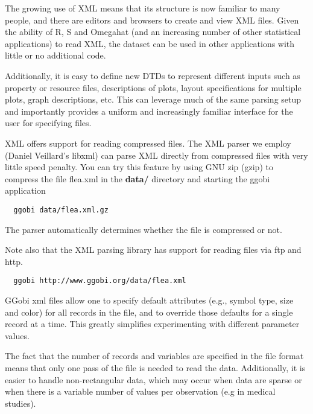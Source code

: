 \documentclass{article}
\def\strip#1>{}
\def\Escape#1{\def\next{#1}%
{\frenchspacing\expandafter\strip\meaning\next}}
\def\dir#1{\textbf{\Escape{#1/}}}
\def\directory#1{\dir{#1}}
\begin{document}
The growing use of XML means that its structure is now familiar to
many people, and there are editors and browsers to create and view XML
files.  Given the ability of R, S and Omegahat (and an increasing
number of other statistical applications) to read XML, the dataset can
be used in other applications with little or no additional code.


Additionally, it is easy to define new DTDs to represent different
inputs such as property or resource files, descriptions of plots,
layout specifications for multiple plots, graph descriptions, etc.
This can leverage much of the same parsing setup and importantly
provides a uniform and increasingly familiar interface for the user
for specifying files.


XML offers support for reading compressed files.  The XML parser we
employ (Daniel Veillard's libxml) can parse XML directly from
compressed files with very little speed penalty.  You can try this
feature by using GNU zip (gzip) to compress the file flea.xml in the
\directory{data} directory and starting the ggobi application
\begin{verbatim}
  ggobi data/flea.xml.gz
\end{verbatim}
The parser automatically determines whether the file is compressed or
not.


Note also that the XML parsing library has support for reading files
via ftp and http.
\begin{verbatim}
  ggobi http://www.ggobi.org/data/flea.xml
\end{verbatim}


GGobi xml files allow one to specify default attributes (e.g., symbol
type, size and color) for all records in the file, and to override
those defaults for a single record at a time.  This greatly simplifies
experimenting with different parameter values.


The fact that the number of records and variables are specified in the
file format means that only one pass of the file is needed to read the
data.  Additionally, it is easier to handle non-rectangular data,
which may occur when data are sparse or when there is a variable number
of values per observation (e.g in medical studies).
\end{document}
